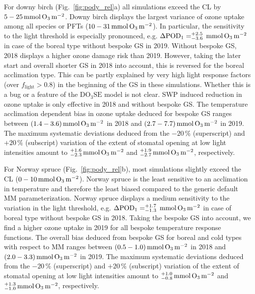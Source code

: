 \documentclass[bg, manuscript]{copernicus}
\begin{document}
For downy birch (Fig.~\ref{fig:pody_rel}a) all simulations exceed the CL by $5-25\,\unit{mmol\,\chem{O_3}\,m^{-2}}$. Downy birch displays the largest variance of ozone uptake among all species or PFTs ($10-31\,\unit{mmol\,\chem{O_3}\,m^{-2}}$). In particular, the sensitivity to the light threshold is especially pronounced, e.g. $\Delta\mathrm{POD_1} = ^{+2.5}_{-3.6}\,\unit{mmol\,\chem{O_3}\,m^{-2}}$ in case of the boreal type without bespoke GS in 2019. Without bespoke GS, 2018 displays a higher ozone damage risk than 2019. However, taking the later start and overall shorter GS in 2018 into account, this is reversed for the boreal acclimation type. This can be partly explained by very high light response factors (over $f_\mathrm{light}>0.8$) in the beginning of the GS in these simulations. Whether this is a bug or a feature of the $\mathrm{DO_3SE}$ model is not clear. SWP induced reduction in ozone uptake is only effective in 2018 and without bespoke GS. The temperature acclimation dependent bias in ozone uptake deduced for bespoke GS ranges between $(1.4-3.6)\,\unit{mmol\,\chem{O_3}\,m^{-2}}$ in 2018 and $(2.7-7.7)\,\unit{mmol\,\chem{O_3}\,m^{-2}}$ in 2019. The maximum systematic deviations deduced from the $-20\,\unit{\%}$ (superscript) and $+20\,\unit{\%}$ (subscript) variation of the extent of stomatal opening at low light intensities amount to $^{+1.6}_{-2.3}\,\unit{mmol\,\chem{O_3}\,m^{-2}}$ and $^{+1.9}_{-2.7}\,\unit{mmol\,\chem{O_3}\,m^{-2}}$, respectively. 

For Norway spruce (Fig.~\ref{fig:pody_rel}b), most simulations slightly exceed the CL ($0-10\,\unit{mmol\,\chem{O_3}\,m^{-2}}$). Norway spruce is the least sensitive to an acclimation in temperature and therefore the least biased compared to the generic default MM parameterization. Norway spruce displays a medium sensitivity to the variation in the light threshold, e.g. $\Delta\mathrm{POD_1} = ^{+1.7}_{-1.3}\,\unit{mmol\,\chem{O_3}\,m^{-2}}$ in case of boreal type without bespoke GS in 2018. Taking the bespoke GS into account, we find a higher ozone uptake in 2019 for all bespoke temperature response functions. The overall bias deduced from bespoke GS for boreal and cold types with respect to MM ranges between $(0.5-1.0)\,\unit{mmol\,\chem{O_3}\,m^{-2}}$ in 2018 and $(2.0-3.3)\,\unit{mmol\,\chem{O_3}\,m^{-2}}$ in 2019. The maximum systematic deviations deduced from the $-20\,\unit{\%}$ (superscript) and $+20\,\unit{\%}$ (subscript) variation of the extent of stomatal opening at low light intensities amount to $^{+1.0}_{-0.8}\,\unit{mmol\,\chem{O_3}\,m^{-2}}$ and $^{+1.3}_{-1.0}\,\unit{mmol\,\chem{O_3}\,m^{-2}}$, respectively.
\end{document}
